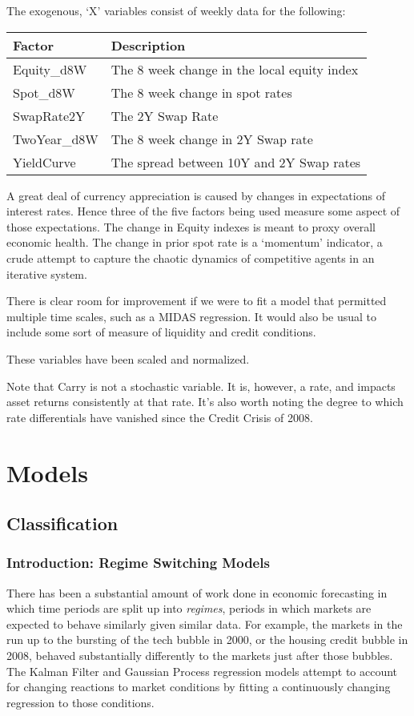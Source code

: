 \documentclass[]{article}
\begin{document}
The exogenous, `X' variables consist of weekly data for the following:

\begin{longtable}[]{@{}ll@{}}
\toprule
Factor & Description\tabularnewline
\midrule
\endhead
Equity\_d8W & The 8 week change in the local equity index\tabularnewline
Spot\_d8W & The 8 week change in spot rates\tabularnewline
SwapRate2Y & The 2Y Swap Rate\tabularnewline
TwoYear\_d8W & The 8 week change in 2Y Swap rate\tabularnewline
YieldCurve & The spread between 10Y and 2Y Swap rates\tabularnewline
\bottomrule
\end{longtable}

A great deal of currency appreciation is caused by changes in
expectations of interest rates. Hence three of the five factors being
used measure some aspect of those expectations. The change in Equity
indexes is meant to proxy overall economic health. The change in prior
spot rate is a `momentum' indicator, a crude attempt to capture the
chaotic dynamics of competitive agents in an iterative system.

There is clear room for improvement if we were to fit a model that
permitted multiple time scales, such as a MIDAS regression. It would
also be usual to include some sort of measure of liquidity and credit
conditions.

These variables have been scaled and normalized.

Note that Carry is not a stochastic variable. It is, however, a rate,
and impacts asset returns consistently at that rate. It's also worth
noting the degree to which rate differentials have vanished since the
Credit Crisis of 2008.

\section{Models}\label{models}

\subsection{Classification}\label{classification}

\subsubsection{Introduction: Regime Switching
Models}\label{introduction-regime-switching-models}

There has been a substantial amount of work done in economic forecasting
in which time periods are split up into \emph{regimes}, periods in which
markets are expected to behave similarly given similar data. For
example, the markets in the run up to the bursting of the tech bubble in
2000, or the housing credit bubble in 2008, behaved substantially
differently to the markets just after those bubbles. The Kalman Filter
and Gaussian Process regression models attempt to account for changing
reactions to market conditions by fitting a continuously changing
regression to those conditions.
\end{document}

